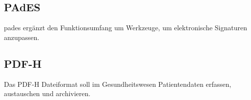 \subsection{PAdES}
\gls{pades} ergänzt den Funktionsumfang um Werkzeuge, um elektronische Signaturen anzupassen.

\subsection{PDF-H}
Das PDF-H Dateiformat soll im Gesundheitswesen Patientendaten erfassen, austauschen und archivieren.

